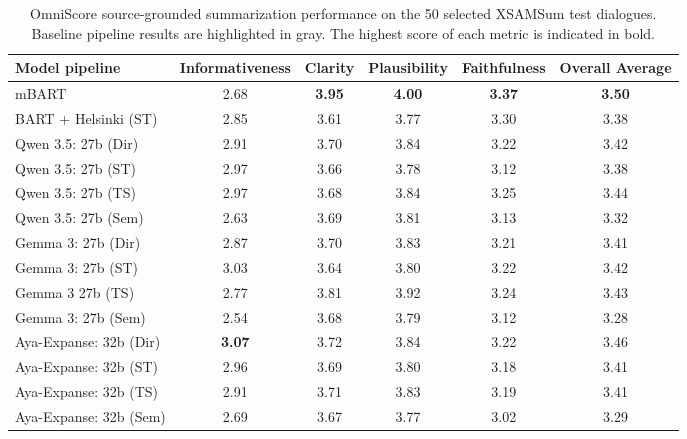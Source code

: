 \documentclass[11pt]{article}
\begin{document}
\begin{table}[ht]
\centering
\small
\begin{tabular}{lccccc}
\hline
\textbf{Model pipeline} & \textbf{Informativeness} & \textbf{Clarity} & \textbf{Plausibility} & \textbf{Faithfulness} & \textbf{Overall Average}\\ \hline

\rowcolor{gray!15}mBART                  & 2.68          & \textbf{3.95} & \textbf{4.00} & \textbf{3.37} & \textbf{3.50} \\
\rowcolor{gray!15}BART + Helsinki (ST)   & 2.85          & 3.61          & 3.77          & 3.30          & 3.38          \\
\hline
Qwen 3.5: 27b (Dir)    & 2.91          & 3.70          & 3.84          & 3.22          & 3.42          \\
Qwen 3.5: 27b (ST)     & 2.97          & 3.66          & 3.78          & 3.12          & 3.38          \\
Qwen 3.5: 27b (TS)     & 2.97          & 3.68          & 3.84          & 3.25          & 3.44          \\
Qwen 3.5: 27b (Sem)    & 2.63          & 3.69          & 3.81          & 3.13          & 3.32          \\
\hline
Gemma 3: 27b (Dir)     & 2.87          & 3.70          & 3.83          & 3.21          & 3.41          \\
Gemma 3: 27b (ST)      & 3.03          & 3.64          & 3.80          & 3.22          & 3.42          \\
Gemma 3 27b (TS)       & 2.77          & 3.81          & 3.92          & 3.24          & 3.43          \\
Gemma 3: 27b (Sem)     & 2.54          & 3.68          & 3.79          & 3.12          & 3.28          \\
\hline
Aya-Expanse: 32b (Dir) & \textbf{3.07} & 3.72          & 3.84          & 3.22          & 3.46          \\
Aya-Expanse: 32b (ST)  & 2.96          & 3.69          & 3.80          & 3.18          & 3.41          \\
Aya-Expanse: 32b (TS)  & 2.91          & 3.71          & 3.83          & 3.19          & 3.41          \\
Aya-Expanse: 32b (Sem) & 2.69          & 3.67          & 3.77          & 3.02          & 3.29 \\
\hline
\end{tabular}
\caption{OmniScore source-grounded summarization performance on the 50 selected XSAMSum test dialogues. Baseline pipeline results are highlighted in gray. The highest score of each metric is indicated in bold.}
\label{tab:omniscore_source_grounded}
\end{table}
\end{document}
